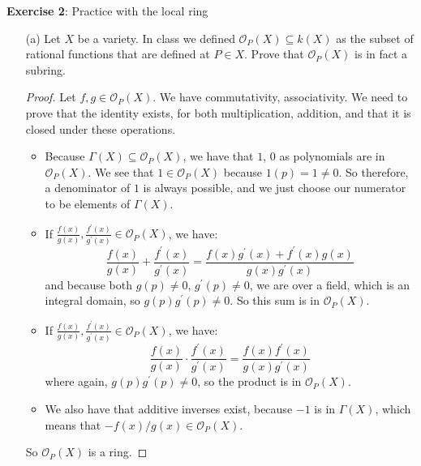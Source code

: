 \documentclass{article}
\begin{document}
\textbf{Exercise 2}: Practice with the local ring
    \begin{itemize}
        \item [(a)] Let $X$ be a variety. In class we defined $\mathcal{O}_{P}(X) \subseteq k(X)$ as the subset of rational functions that are defined at $P \in X$. Prove that $\mathcal{O}_{P}(X)$ is in fact a subring.
            \begin{proof}
                Let $f, g \in \mathcal{O}_{P}(X)$. We have commutativity, associativity. We need to prove that the identity exists, for both multiplication, addition, and that it is closed under these operations.
                    \begin{itemize}
                        \item Because $\Gamma(X) \subseteq \mathcal{O}_{P}(X)$, we have that $1$, $0$ as polynomials are in $\mathcal{O}_{P}(X)$. We see that $1 \in \mathcal{O}_{P}(X)$ because $1(p) = 1 \neq 0$. So therefore, a denominator of $1$ is always possible, and we just choose our numerator to be elements of $\Gamma(X)$.

                        \item If $\frac{f(x)}{g(x)}, \frac{f^{\prime}(x)}{g^{\prime}(x)} \in \mathcal{O}_{P}(X)$, we have:
                            \begin{equation*}
                                \dfrac{f(x)}{g(x)}  + \dfrac{f^{\prime}(x)}{g^{\prime}(x)} = \dfrac{f(x)g^{\prime}(x) + f^{\prime}(x)g(x)}{g(x)g^{\prime}(x)}
                            \end{equation*}
                        and because both $g(p) \neq 0$, $g^{\prime}(p) \neq 0$, we are over a field, which is an integral domain, so $g(p)g^{\prime}(p) \neq 0$. So this sum is in $\mathcal{O}_{P}(X)$.

                        \item If $\frac{f(x)}{g(x)}, \frac{f^{\prime}(x)}{g^{\prime}(x)} \in \mathcal{O}_{P}(X)$, we have:
                            \begin{equation*}
                                \dfrac{f(x)}{g(x)} \cdot \dfrac{f^{\prime}(x)}{g^{\prime}(x)} = \dfrac{f(x)f^{\prime}(x)}{g(x)g^{\prime}(x)}
                            \end{equation*}
                        where again, $g(p)g^{\prime}(p) \neq 0$, so the product is in $\mathcal{O}_{P}(X)$.

                        \item We also have that additive inverses exist, because $-1$ is in $\Gamma(X)$, which means that $-f(x)/g(x) \in \mathcal{O}_{P}(X)$. 
                    \end{itemize}
                So $\mathcal{O}_{P}(X)$ is a ring.
            \end{proof}


\end{itemize}
\end{document}
